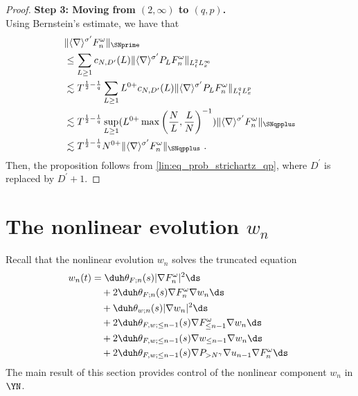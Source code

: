 \documentclass[11pt]{article}
\begin{document}
\begin{proof}
\textbf{Step 3: Moving from \((2,\infty)\) to \( (q,p) \).} ~\\
Using Bernstein's estimate, we have that
\begin{align*}
&\| \langle \nabla \rangle^{\sigma^\prime} F_n^\omega \|_{\SNprime}\\
&\leq \sum_{L\geq 1} c_{N,D^\prime}(L) \| \langle \nabla \rangle^{\sigma^\prime} P_L F_n^\omega \|_{L_t^2 L_x^\infty} \\
&\lesssim T^{\frac{1}{2}-\frac{1}{q}} \sum_{L\geq 1} L^{0+} c_{N,D^\prime}(L)  \| \langle \nabla \rangle^{\sigma^\prime} P_L F_n^\omega \|_{L_t^q L_x^p}\\
&\lesssim T^{\frac{1}{2}-\frac{1}{q}} \sup_{L\geq 1} (L^{0+} \max \left( \frac{N}{L}, \frac{L}{N}\right)^{-1} ) \| \langle \nabla \rangle^{\sigma^\prime} F_n^\omega \|_{\SNqpplus} \\
&\lesssim  T^{\frac{1}{2}-\frac{1}{q}} N^{0+} \| \langle \nabla \rangle^{\sigma^\prime} F_n^\omega \|_{\SNqpplus}~. 
\end{align*}
Then, the proposition follows from \eqref{lin:eq_prob_strichartz_qp}, where \( D^\prime \) is replaced by \( D^\prime+1\).
\end{proof}


\section{The nonlinear evolution \( w_n \)}
Recall that the nonlinear evolution \( w_n \) solves the truncated equation
\label{nl:eq_truncated_wn}
\begin{align}
w_n(t) &= \duh  \theta_{F;n}(s) |\nabla F_n^\omega|^2\ds  \notag \\
		&~~~+ 2 \duh \theta_{F;n}(s) \nabla F_n^\omega \nabla w_n \ds \notag\\
		&~~~+ \duh \theta_{w;n}(s) |\nabla w_n|^2\ds\notag\\
		&~~~+ 2 \duh \theta_{F,w;\leq n-1}(s) \nabla F_{\leq n-1}^\omega \nabla w_n \ds \label{nl:eq_truncated_wn}\\
		&~~~+ 2 \duh \theta_{F,w;\leq n-1}(s) \nabla w_{\leq n-1} \nabla w_n \ds\notag \\
		&~~~+ 2 \duh \theta_{F,w;\leq n-1}(s) \nabla P_{>N^\gamma} \nabla u_{n-1}\nabla F_n^\omega \ds~\notag \\
\end{align}
The main result of this section provides control of the nonlinear component \( w_n \) in \( \YN \). 
\end{document}
